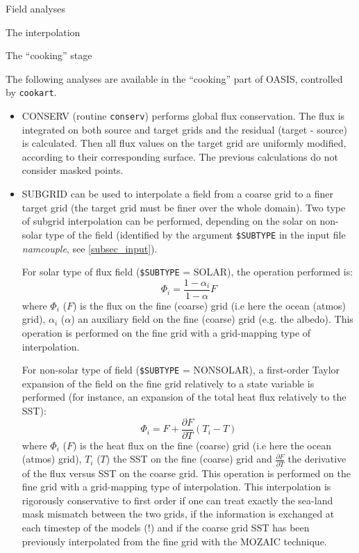 \begin{subsection}{Field analyses}
\begin{subsubsection}{The interpolation}
\begin{itemize}
\end{itemize}

\end{subsubsection}

\begin{subsubsection}{The ``cooking'' stage}
\label{subsubsec_cooking}

The following analyses are available in the ``cooking'' part of
OASIS, controlled by {\tt cookart}.

\begin{itemize}

\item CONSERV (routine {\tt conserv}) performs global flux
conservation. The flux is
integrated on both source and target grids and the residual 
(target - source) is calculated. Then all flux values on the target 
grid are uniformly modified, according to their corresponding
surface. The previous 
calculations do not consider masked points.
    
\item SUBGRID can be used to interpolate a field from a
coarse grid to a finer target grid (the target grid must be finer over
the whole domain). Two type of subgrid
interpolation can be performed, depending on the solar on non-solar
type of the field (identified by the argument {\tt \$SUBTYPE} in the input
file {\em namcouple}, see \ref{subsec_input}).

For solar type of flux field ({\tt \$SUBTYPE} = SOLAR), the operation performed
is:
$$\Phi_{i} = \frac{1-\alpha_i}{1-\alpha} F$$
where  $\Phi_{i}$ ($F$) is the flux 
on the fine (coarse) grid (i.e here the ocean (atmos) grid), 
$\alpha_i$ ($\alpha$) an auxiliary field on the fine (coarse) grid
(e.g. the albedo).
This operation is performed on the fine grid with a
grid-mapping type of interpolation.

For non-solar type of field ({\tt \$SUBTYPE} = NONSOLAR), a first-order 
Taylor expansion of the field on the fine
grid relatively to a state variable is performed (for instance, an expansion of
the total heat flux relatively to the SST): 
$$\Phi_{i} = F + \frac{\partial F}{\partial T} 
( T_i - T ) $$ where  $\Phi_{i}$ ($F$) is the heat flux 
on the fine (coarse) grid (i.e here the ocean (atmos) grid), 
$T_i$ ($T$) the SST on the fine (coarse) grid 
and $\frac{\partial F}{\partial T}$ the derivative of the flux versus
SST on the coarse grid. This operation is performed on the fine grid 
with a
grid-mapping type of interpolation. This interpolation is rigorously 
conservative 
to first order \cite{dufresne} if one can treat exactly the sea-land mask mismatch 
between the two grids, if the information is exchanged at each
timestep of the models (!) and if the coarse grid SST has been
previously interpolated from the fine grid with the MOZAIC technique. 


\end{itemize}
\end{subsubsection}
\end{subsection}

